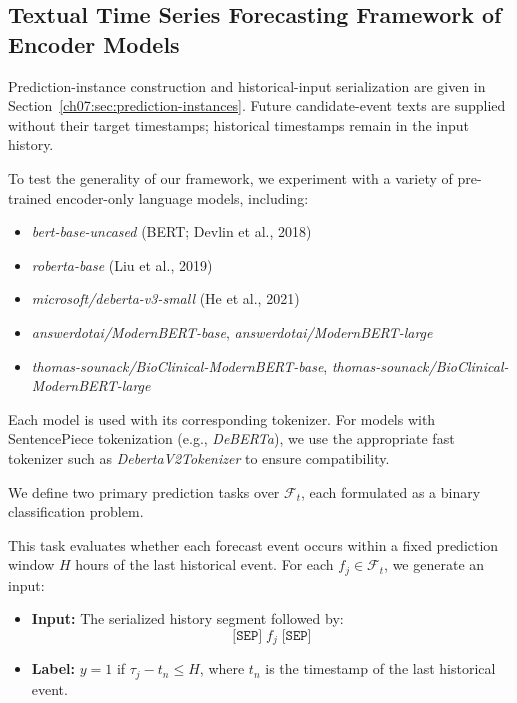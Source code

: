 \subsection{Textual Time Series Forecasting Framework of Encoder Models}
\label{ch07:apd:encoder-forecasting}

Prediction-instance construction and historical-input serialization are given in Section~\ref{ch07:sec:prediction-instances}.
Future candidate-event texts are supplied without their target timestamps; historical timestamps remain in the input history.

To test the generality of our framework, we experiment with a variety of pre-trained encoder-only language models, including:
\begin{itemize}\raggedright
    \item \textit{bert-base-uncased} (BERT; Devlin et al., 2018)
    \item \textit{roberta-base} (Liu et al., 2019)
    \item \textit{microsoft/deberta-v3-small} (He et al., 2021)
    \item \textit{answerdotai/ModernBERT-base}, \textit{answerdotai/ModernBERT-large}
    \item \textit{thomas-sounack/BioClinical-ModernBERT-base}, \textit{thomas-sounack/BioClinical-ModernBERT-large}
\end{itemize}
Each model is used with its corresponding tokenizer.
For models with SentencePiece tokenization (e.g., \textit{DeBERTa}), we use the appropriate fast tokenizer such as \textit{DebertaV2Tokenizer} to ensure compatibility.

We define two primary prediction tasks over $\mathcal{F}_t$, each formulated as a binary classification problem.

This task evaluates whether each forecast event occurs within a fixed prediction window $H$ hours of the last historical event.
For each $f_j \in \mathcal{F}_t$, we generate an input:

\begin{itemize}
    \item \textbf{Input:} The serialized history segment followed by:
    \begin{equation}
        \texttt{[SEP]} \; f_j \; \texttt{[SEP]}
    \end{equation}
    \item \textbf{Label:} $y = 1$ if $\tau_j - t_n \leq H$, where $t_n$ is the timestamp of the last historical event.
\end{itemize}

